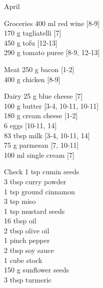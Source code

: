 \begin{menu}{April}
\begin{shoppinglist}{Groceries}
      400 ml red wine {\scriptsize[8-9]}\\
      170 g tagliatelli {\scriptsize[7]}\\
      450 g tofu {\scriptsize[12-13]}\\
      290 g tomato puree {\scriptsize[8-9, 12-13]}\\
      \end{shoppinglist}%
      \par\vfil %
      \begin{shoppinglist}{Meat}
      250 g bacon {\scriptsize[1-2]}\\
      400 g chicken {\scriptsize[8-9]}\\
      \end{shoppinglist}%
      \begin{shoppinglist}{Dairy}
      25 g blue cheese {\scriptsize[7]}\\
      100 g butter {\scriptsize[3-4, 10-11, 10-11]}\\
      180 g cream cheese {\scriptsize[1-2]}\\
      6  eggs {\scriptsize[10-11, 14]}\\
      83 tbsp milk {\scriptsize[3-4, 10-11, 14]}\\
      75 g parmesan {\scriptsize[7, 10-11]}\\
      100 ml single cream {\scriptsize[7]}\\
      \end{shoppinglist}%
      \par\vfil %
      \vfil\clearpage %
      \begin{shoppinglist}{Check}
      1 tsp cumin seeds \\
      3 tbsp curry powder \\
      1 tsp ground cinnamon \\
      3 tsp miso \\
      1 tsp mustard seeds \\
      16 tbsp oil \\
      2 tbsp olive oil \\
      1 pinch pepper \\
      2 tbsp soy sauce \\
      1 cube stock \\
      150 g sunflower seeds \\
      3 tbsp turmeric \\
      \end{shoppinglist}%

\end{menu}
